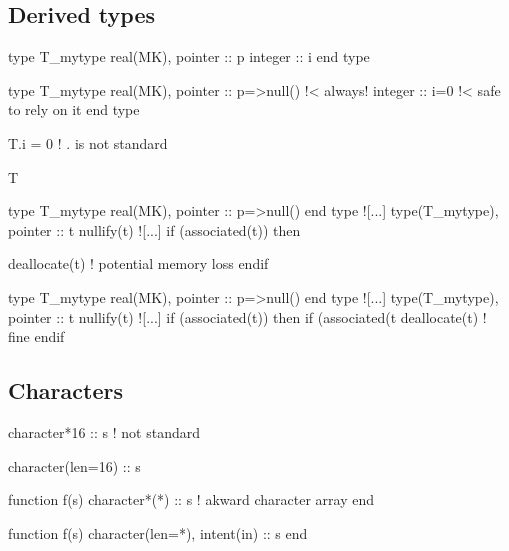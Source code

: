 \documentclass{article}
\begin{document}
\subsection{Derived types}
\label{sec:derivedtypes}
\begin{codea}
type T_mytype
  real(MK), pointer :: p
  integer :: i
end type
\end{codea} 
\begin{codeb}
type T_mytype
  real(MK), pointer :: p=>null() !< always!
  integer :: i=0 !< safe to rely on it
end type
\end{codeb}
\begin{codea}
T.i = 0 ! . is not standard
\end{codea} 
\begin{codeb}
T%
\end{codeb}
\begin{codea}
type T_mytype
  real(MK), pointer :: p=>null() 
end type
![...]
type(T_mytype), pointer :: t
nullify(t)
![...]
if (associated(t)) then 

   deallocate(t) ! potential memory loss
endif
\end{codea} 
\begin{codeb}
type T_mytype
  real(MK), pointer :: p=>null()
end type
![...]
type(T_mytype), pointer :: t
nullify(t)
![...]
if (associated(t)) then
    if (associated(t%
    deallocate(t) ! fine
endif
\end{codeb}




\subsection{Characters}
\label{sec:characters}
\begin{codea}
character*16 :: s ! not standard
\end{codea} 
\begin{codeb}
character(len=16) :: s
\end{codeb}
\begin{codea}
function f(s)
  character*(*) :: s ! akward character array
end
\end{codea} 
\begin{codeb}
function f(s)
  character(len=*), intent(in) :: s
end
\end{codeb}
\end{document}
